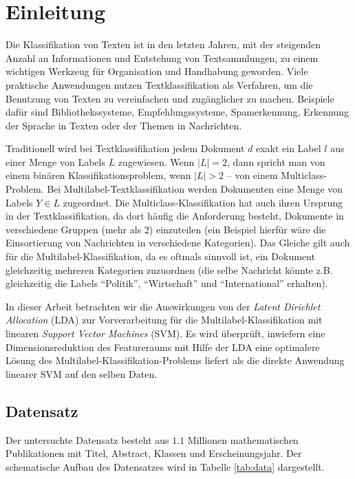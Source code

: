 \section{Einleitung}

\begin{comment}
Einführung und Einbettung des Problems
Was ist die konkrete Problemstellung / Fragestellung der Arbeit
Literature Review
\end{comment}

Die Klassifikation von Texten ist in den letzten Jahren, mit der steigenden Anzahl an Informationen und Entstehung von Textsammlungen, zu einem wichtigen Werkzeug für Organisation und Handhabung geworden.
Viele praktische Anwendungen nutzen Textklassifikation als Verfahren, um die Benutzung von Texten zu vereinfachen und zugänglicher zu machen.
Beispiele dafür sind Bibliothekssysteme, Empfehlungssysteme, Spamerkennung, Erkennung der Sprache in Texten oder der Themen in Nachrichten.

Traditionell wird bei Textklassifikation jedem Dokument $d$ exakt ein Label $l$ aus einer Menge von Labels $L$ zugewiesen.
Wenn $|L| = 2$, dann spricht man von einem binären Klassifikationsproblem, wenn $|L| > 2$ -- von einem Multiclass-Problem.
Bei Multilabel-Textklassifikation werden Dokumenten eine Menge von Labels $Y \in L$ zugeordnet.
Die Multiclass-Klassifikation hat auch ihren Ursprung in der Textklassifikation, da dort häufig die Anforderung besteht, Dokumente in verschiedene Gruppen (mehr als 2) einzuteilen (ein Beispiel hierfür wäre die Einsortierung von Nachrichten in verschiedene Kategorien).
Das Gleiche gilt auch für die Multilabel-Klassifikation, da es oftmals sinnvoll ist, ein Dokument gleichzeitig mehreren Kategorien zuzuordnen (die selbe Nachricht könnte z.B. gleichzeitig die Labels ``Politik'', ``Wirtschaft'' und ``International'' erhalten).

In dieser Arbeit betrachten wir die Auswirkungen von der \emph{Latent Dirichlet Allocation} (LDA) zur Vorverarbeitung für die Multilabel-Klassifikation mit linearen \emph{Support Vector Machines} (SVM).
Es wird überprüft, inwiefern eine Dimensionsreduktion des Featureraums mit Hilfe der LDA eine optimalere Lösung des Multilabel-Klassifikation-Problems liefert als die direkte Anwendung linearer SVM auf den selben Daten.

\subsection{Datensatz}
\label{sub:datensatz}
Der untersuchte Datensatz besteht aus $1.1$ Millionen mathematischen Publikationen mit Titel, Abstract, Klassen und Erscheinungsjahr.
Der schematische Aufbau des Datensatzes wird in Tabelle \ref{tab:data} dargestellt.

